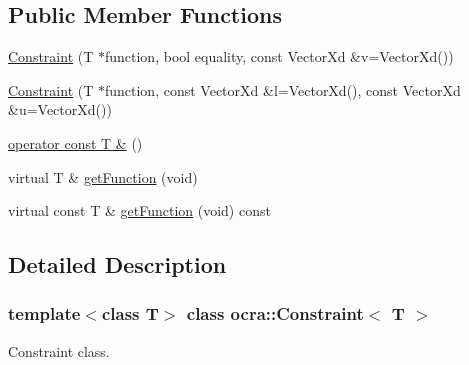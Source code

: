 \subsection*{Public Member Functions}
\begin{DoxyCompactItemize}
\item 
\hyperlink{classocra_1_1Constraint_a73cc6c5b8e5c29ae3c1d8ed997c9e6e5}{Constraint} (T $\ast$function, bool equality, const Vector\+Xd \&v=Vector\+Xd())
\item 
\hyperlink{classocra_1_1Constraint_aca55ef9a5ea48fa91d846c53f4e30ad1}{Constraint} (T $\ast$function, const Vector\+Xd \&l=Vector\+Xd(), const Vector\+Xd \&u=Vector\+Xd())
\item 
\hyperlink{classocra_1_1Constraint_a4a0f49dbc4042347872429298f689091}{operator const T \&} ()
\end{DoxyCompactItemize}
{\bf }\par
\begin{DoxyCompactItemize}
\item 
virtual T \& \hyperlink{classocra_1_1Constraint_a6083fd05133e7aefae68fc84641149c1}{get\+Function} (void)
\item 
virtual const T \& \hyperlink{classocra_1_1Constraint_a2bda1f6319de9c803571a232d790f497}{get\+Function} (void) const
\end{DoxyCompactItemize}



\subsection{Detailed Description}
\subsubsection*{template$<$class T$>$\newline
class ocra\+::\+Constraint$<$ T $>$}

Constraint class. 

